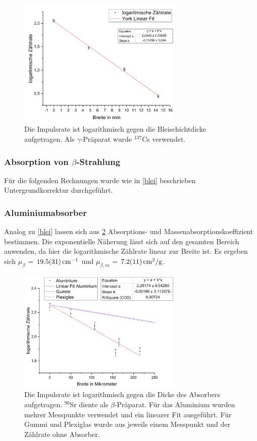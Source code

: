 \documentclass[
	a4paper,
	12pt,
	pagesize,
	ngerman
]{scrartcl}
\begin{document}
	\begin{figure}[H]
		\includegraphics[width=0.7\textwidth]{GammaBlei}
		\centering
		\caption{Die Impulsrate ist logarithmisch gegen die Bleischichtdicke aufgetragen. Als $\gamma$-Präparat wurde $ ^{137}$Cs verwendet.}%
		\label{GammaBlei}
		\centering
	\end{figure}
	
	
	
	\subsubsection{Absorption von $\beta$-Strahlung} 
	Für die folgenden Rechnungen wurde wie in \cref{blei} beschrieben Untergrundkorrektur durchgeführt.
	\subsubsection*{Aluminiumabsorber}
	
	Analog zu \cref{blei} lassen sich aus \cref{BetaAlu} Absorptions- und Massenabsorptionskoeffizient bestimmen. 
	Die exponentielle Näherung lässt sich auf den gesamten Bereich anwenden, da hier die logarithmische Zählrate linear zur Breite ist.
	Es ergeben sich $\mu_\beta$ = $\SI{19,5 +- 3,1}{cm^{-1}}$ und $\mu_{\beta,m}$ = $\SI{7,2+-1,1}{cm^2/g}$.
	\begin{figure}[H]
		\includegraphics[width=0.7\textwidth]{BetaAlu}
		\centering
		\caption{Die Impulsrate ist logarithmisch gegen die Dicke des Absorbers aufgetragen. $ ^{90}$Sr diente als $\beta$-Präparat. Für das Aluminium wurden mehrer Messpunkte verwendet und ein linearer Fit ausgeführt. Für Gummi und Plexiglas wurde aus jeweils einem Messpunkt und der Zählrate ohne Absorber.}
		\label{BetaAlu}
		\centering
	\end{figure}
\end{document}
